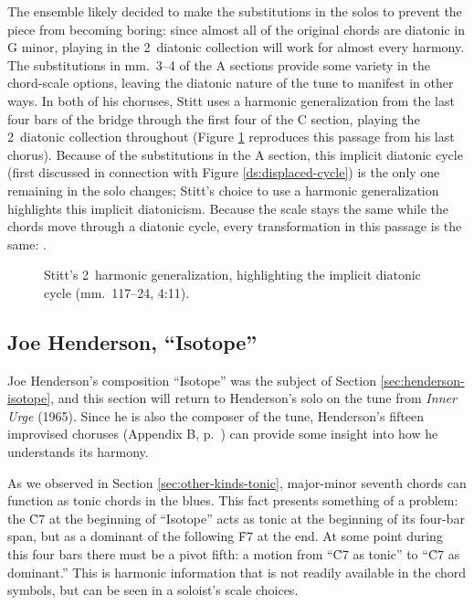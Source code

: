 The ensemble likely decided to make the substitutions in the solos to prevent
the piece from becoming boring: since almost all of the original chords are
diatonic in G minor, playing in the 2\flat\ diatonic collection will work for
almost every harmony. The substitutions in mm.~3--4 of the A
sections provide some variety in the chord-scale options, leaving the diatonic
nature of the tune to manifest in other ways. In both of his choruses, Stitt
uses a harmonic generalization from the last four bars of the bridge through the
first four of the C section, playing the 2\flat\ diatonic collection
throughout (Figure \ref{csa:stitt-diatonic-generalization} reproduces this
passage from his last chorus). Because of the substitutions in the A section,
this implicit diatonic cycle (first discussed in connection with Figure
\ref{ds:displaced-cycle}) is the only one remaining in the solo changes;
Stitt's choice to use a harmonic generalization highlights this implicit
diatonicism. Because the scale stays the same while the chords move
through a diatonic cycle, every transformation in this passage is the same:
.

\begin{figure}[tbp]
  \caption[Stitt's 2\flat\ harmonic generalization, highlighting the implicit
    diatonic cycle.]{Stitt's 2\kern1pt\flat\ harmonic generalization,
    highlighting the implicit diatonic cycle (mm.~117--24, 4:11).}
  \label{csa:stitt-diatonic-generalization}
\end{figure}

\subsection{Joe Henderson, “Isotope”}
\label{subsec:isotope-solo}

Joe Henderson's composition ``Isotope'' was the subject of Section
\ref{sec:henderson-isotope}, and this section will return to Henderson's solo on
the tune from \emph{Inner Urge} (1965). Since he is also the composer of the
tune, Henderson's fifteen improvised choruses (Appendix B,
p.~\pageref{transcription:isotope}) can provide some insight into how he
understands its harmony.


As we observed in Section \ref{sec:other-kinds-tonic}, major-minor seventh
chords can function as tonic chords in the blues. This fact presents something
of a problem: the \h{C7} at the beginning of ``Isotope''
acts as tonic at the beginning of its four-bar span, but as a dominant of the
following \h{F7} at the end. At some point during this four bars
there must be a pivot fifth: a motion from ``\h{C7} as tonic'' to ``\h{C7} as
dominant.'' This is harmonic information that is not readily available in the
chord symbols, but can be seen in a soloist's scale choices.

